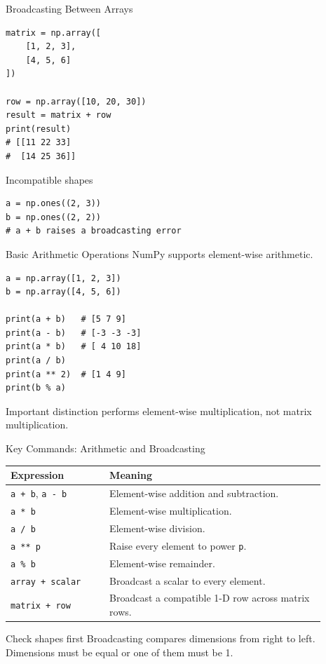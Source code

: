 \documentclass[aspectratio=169,11pt]{beamer}
\begin{document}
\begin{frame}[fragile]{Broadcasting Between Arrays}
\small
\begin{lstlisting}[style=py]
matrix = np.array([
    [1, 2, 3],
    [4, 5, 6]
])

row = np.array([10, 20, 30])
result = matrix + row
print(result)
# [[11 22 33]
#  [14 25 36]]
\end{lstlisting}
\begin{alertblock}{Incompatible shapes}
\begin{lstlisting}[style=py]
a = np.ones((2, 3))
b = np.ones((2, 2))
# a + b raises a broadcasting error
\end{lstlisting}
\end{alertblock}
\end{frame}

\begin{frame}[fragile]{Basic Arithmetic Operations}
\small
NumPy supports element-wise arithmetic.
\begin{lstlisting}[style=py]
a = np.array([1, 2, 3])
b = np.array([4, 5, 6])

print(a + b)   # [5 7 9]
print(a - b)   # [-3 -3 -3]
print(a * b)   # [ 4 10 18]
print(a / b)
print(a ** 2)  # [1 4 9]
print(b % a)
\end{lstlisting}
\begin{block}{Important distinction}
\texttt{\*} performs element-wise multiplication, not matrix multiplication.
\end{block}
\end{frame}

\begin{frame}{Key Commands: Arithmetic and Broadcasting}
\small
\begin{tabular}{p{0.28\linewidth}p{0.61\linewidth}}
\toprule
\textbf{Expression} & \textbf{Meaning} \\
\midrule
\texttt{a + b}, \texttt{a - b} & Element-wise addition and subtraction. \\
\texttt{a * b} & Element-wise multiplication. \\
\texttt{a / b} & Element-wise division. \\
\texttt{a ** p} & Raise every element to power \texttt{p}. \\
\texttt{a \% b} & Element-wise remainder. \\
\texttt{array + scalar} & Broadcast a scalar to every element. \\
\texttt{matrix + row} & Broadcast a compatible 1-D row across matrix rows. \\
\bottomrule
\end{tabular}
\begin{alertblock}{Check shapes first}
Broadcasting compares dimensions from right to left. Dimensions must be equal or one of them must be 1.
\end{alertblock}
\end{frame}
\end{document}
